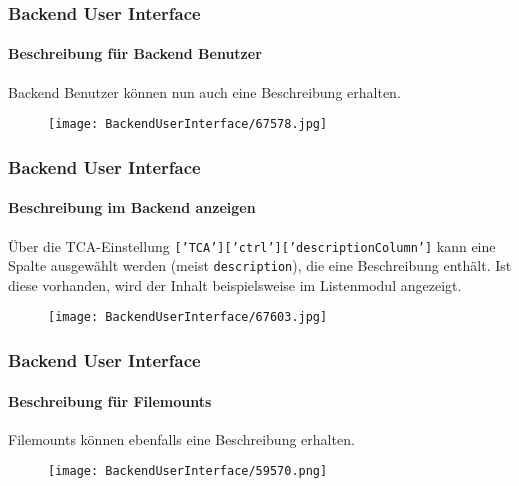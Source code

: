 \begin{frame}[fragile]
	\frametitle{Backend User Interface}
	\framesubtitle{Beschreibung für Backend Benutzer}

	Backend Benutzer können nun auch eine Beschreibung erhalten.

	\begin{figure}
		\texttt{[image: BackendUserInterface/67578.jpg]}
	\end{figure}

\end{frame}

\begin{frame}[fragile]
	\frametitle{Backend User Interface}
	\framesubtitle{Beschreibung im Backend anzeigen}

	Über die TCA-Einstellung \texttt{['TCA']['ctrl']['descriptionColumn']} kann eine Spalte ausgewählt werden
	(meist \texttt{description}), die eine Beschreibung enthält.
	Ist diese vorhanden, wird der Inhalt beispielsweise im Listenmodul angezeigt.

	\begin{figure}
		\texttt{[image: BackendUserInterface/67603.jpg]}
	\end{figure}

\end{frame}

\begin{frame}[fragile]
	\frametitle{Backend User Interface}
	\framesubtitle{Beschreibung für Filemounts}

	Filemounts können ebenfalls eine Beschreibung erhalten.

	\begin{figure}
		\texttt{[image: BackendUserInterface/59570.png]}
	\end{figure}

\end{frame}

